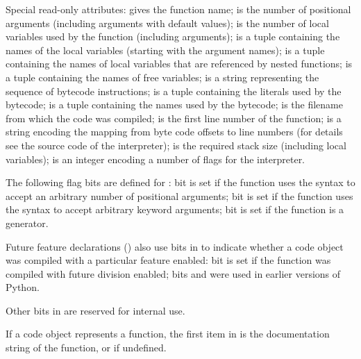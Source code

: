 \begin{description}
\begin{description}
Special read-only attributes:  gives the function
name;  is the number of positional arguments
(including arguments with default values);  is the
number of local variables used by the function (including arguments);
 is a tuple containing the names of the local
variables (starting with the argument names);  is
a tuple containing the names of local variables that are referenced by
nested functions;  is a tuple containing the names
of free variables;  is a string representing the
sequence of bytecode instructions;
 is a tuple containing the literals used by the
bytecode;  is a tuple containing the names used by
the bytecode;  is the filename from which the code
was compiled;  is the first line number of the
function;  is a string encoding the mapping from
byte code offsets to line numbers (for details see the source code of
the interpreter);  is the required stack size
(including local variables);  is an integer encoding
a number of flags for the interpreter.


The following flag bits are defined for : bit
 is set if the function uses the  syntax
to accept an arbitrary number of positional arguments; bit
 is set if the function uses the  syntax
to accept arbitrary keyword arguments; bit  is set if the
function is a generator.

Future feature declarations ()
also use bits in  to indicate whether a code object
was compiled with a particular feature enabled: bit  is
set if the function was compiled with future division enabled; bits
 and  were used in earlier versions of Python.

Other bits in  are reserved for internal use.

If a code object represents a function,
the first item in
 is the documentation string of the function, or
 if undefined.


\end{description}
\end{description}
